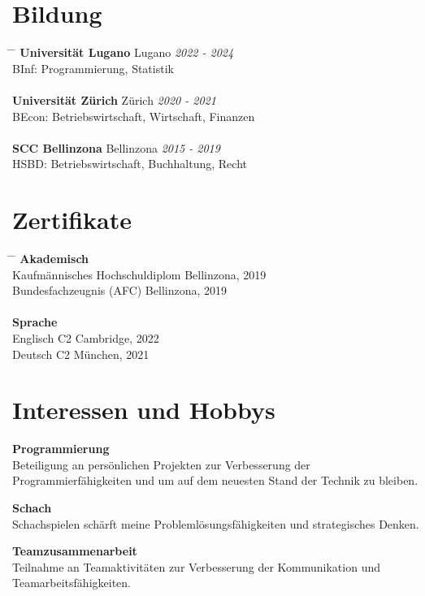 \documentclass[a4paper,11pt]{article}  %
\begin{document}
\section*{Bildung}
\begin{tabbing}
\hspace{3.5in} \= \hspace{2in} \= \kill
\textbf{Universität Lugano} \> Lugano \> \textit{2022 - 2024} \\
BInf: Programmierung, Statistik \> \\
\\
\textbf{Universität Zürich} \> Zürich \> \textit{2020 - 2021} \\
BEcon: Betriebswirtschaft, Wirtschaft, Finanzen \> \\
\\
\textbf{SCC Bellinzona} \> Bellinzona \> \textit{2015 - 2019} \\
HSBD: Betriebswirtschaft, Buchhaltung, Recht \> \\
\end{tabbing}


\section*{Zertifikate}
\begin{tabbing}
\hspace{3.5in} \= \hspace{2in} \= \kill
\textbf{Akademisch} \\
Kaufmännisches Hochschuldiplom \> Bellinzona, 2019 \\
Bundesfachzeugnis (AFC) \> Bellinzona, 2019 \\
\\
\textbf{Sprache} \\
Englisch C2 \> Cambridge, 2022 \\
Deutsch C2 \> München, 2021 \\
\end{tabbing}

\newpage

\section*{Interessen und Hobbys}
\begin{multicols}{3}
\justifying
\textbf{Programmierung} \\
Beteiligung an persönlichen Projekten
zur Verbesserung der Programmierfähigkeiten und
um auf dem neuesten Stand der Technik zu bleiben.

\columnbreak

\justifying
\textbf{Schach} \\
Schachspielen schärft meine
Problemlösungsfähigkeiten und
strategisches Denken.

\columnbreak

\justifying
\textbf{Teamzusammenarbeit} \\
Teilnahme an Teamaktivitäten
zur Verbesserung der Kommunikation
und Teamarbeitsfähigkeiten.
\end{multicols}
\end{document}

